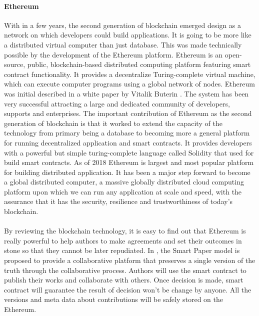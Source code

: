 \documentclass [11pt]{report}
\begin{document}
\paragraph{Ethereum}
With in a few years,
the second generation of blockchain emerged design as a network on which developers could build applications. 
It is going to be more like a distributed virtual computer than just database.
This was made technically possible by the development of the Ethereum platform. 
Ethereum is an open-source, public, blockchain-based distributed computing platform featuring smart contract functionality.
It provides a decentralize Turing-complete virtual machine, which can execute computer programs using a global network of nodes.
Ethereum was initial described in a white paper by Vitalik Buterin \cite{buterin2013ethereum}. 
The system has been very successful attracting a large and dedicated community of developers, supports and enterprises.
The important contribution of Ethereum as the second generation of blockchain is that 
it worked to extend the capacity of the technology from primary
being a database to becoming more a general platform for running decentralized application and smart contracts.
It provides developers with a powerful but simple turing-complete language called Solidity that used for build smart contracts.
As of 2018 Ethereum is largest and most popular platform for building distributed application. 
It has been a major step forward to become a global distributed computer, 
a massive globally distributed cloud computing platform upon which we can run any application at scale and speed,
with the assurance that it has the security, resilience and trustworthiness of today's blockchain.
\paragraph{}
By reviewing the blockchain technology, 
it is easy to find out that Ethereum is really powerful to
help authors to make agreements and set their outcomes in stone so that they cannot be later repudiated.
In \cite{Khoe:1994:CML:2288694.2294265}, 
the Smart Paper model is proposed to provide a collaborative platform 
that preserves a single version of the truth through the collaborative process. 
Authors will use the smart contract to publish their works and collaborate with others.
Once decision is made, smart contract will guarantee the result of decision won't be change by anyone.
All the versions and meta data about contributions will be safely stored on the Ethereum.
\end{document}
